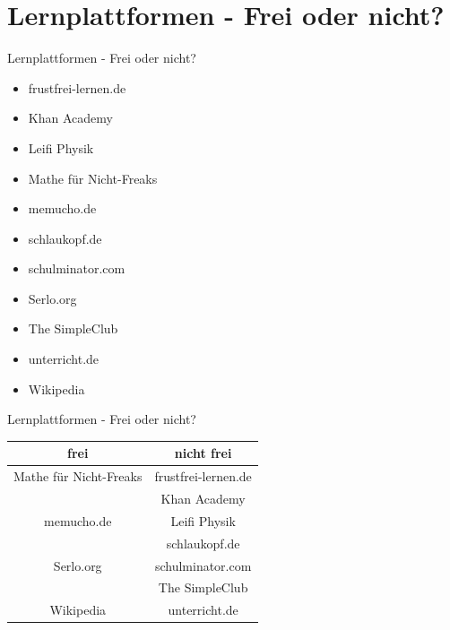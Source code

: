 \documentclass[14pt, usenames, dvipsnames, notes]{beamer}
\begin{document}
\section{Lernplattformen - Frei oder nicht?}

	\begin{frame}{Lernplattformen - Frei oder nicht?}
        \begin{minipage}{.5\textwidth} 
            \begin{itemize}
                \item frustfrei-lernen.de
                \item Khan Academy
                \item Leifi Physik
                \item Mathe für Nicht-Freaks
                \item memucho.de
            \end{itemize}
        \end{minipage}
        \begin{minipage}{.45\textwidth}
            \begin{itemize}
                \item schlaukopf.de
                \item schulminator.com
                \item Serlo.org
                \item The SimpleClub
                \item unterricht.de
                \item Wikipedia
            \end{itemize}
        \end{minipage}
	\end{frame}
	\begin{frame}{Lernplattformen - Frei oder nicht?}
        \begin{tabularx}{\textwidth}{c|c}
			\textbf{frei} & \textbf{nicht frei} \\
			\hline
			Mathe für Nicht-Freaks & frustfrei-lernen.de \\
			& Khan Academy \\
			memucho.de & Leifi Physik \\
			& schlaukopf.de \\
			Serlo.org & schulminator.com \\
			& The SimpleClub \\
			Wikipedia & unterricht.de \\
		\end{tabularx}
	\end{frame}
\end{document}
